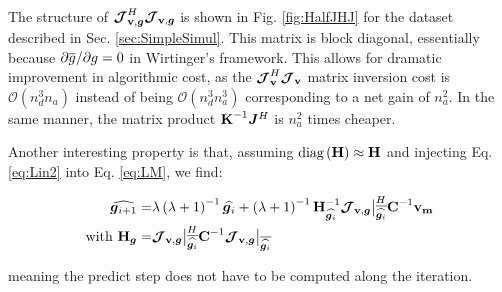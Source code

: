 The structure of $\bm{\mathcal{J}}_{\textbf{v},\bm{g}}^H\bm{\mathcal{J}}_{\textbf{v},\bm{g}}$ is shown in Fig. \ref{fig:HalfJHJ} for
the dataset described in Sec. \ref{sec:SimpleSimul}. This
matrix is block diagonal, essentially because 
$\partial \overline{g}/\partial g=0$ in Wirtinger's framework. This allows
for dramatic improvement in algorithmic cost, as the $\bm{\mathcal{J}}_{\textbf{v}}^H\bm{\mathcal{J}}_{\textbf{v}}$ matrix
inversion cost is $\mathcal{O}\left(n_d^3n_a\right)$ instead of being
$\mathcal{O}\left(n_d^3n_a^3\right)$ corresponding to a net gain of $n^2_a$. In the same manner, the
matrix product $\textbf{K}^{-1}\bm{J}^H$ is $n^2_a$ times cheaper.

Another interesting property is that, assuming
$\text{diag}\left(\textbf{H}\right)\approx\textbf{H}$ and injecting Eq. \ref{eq:Lin2}
into Eq. \ref{eq:LM}, we find:

\def\Fact{\left(\lambda+1\right)^{-1}}
\def\ThisJ{\JVg\big|_{\conj{\widehat{\g_{i}}}}}
\begin{alignat}{2}
\label{eq:HalfLM}
\widehat{\vec{g}_{i+1}}=&\lambda\Fact\widehat{\vec{g}_{i}}+\Fact\H_{\widehat{\vec{g}_{i}}}^{-1}\ThisJ^H\textbf{C}^{-1}\mathbf{v_m}\\
\text{with }\H_{\vec{g}}=&\ThisJ^H\textbf{C}^{-1}\ThisJ
\end{alignat}

\noindent meaning the predict step does not have to be computed along
the iteration.





